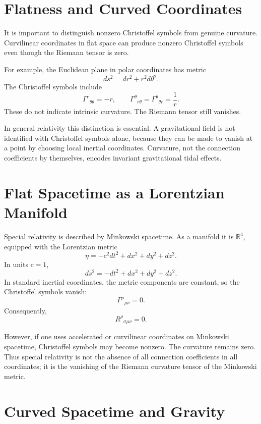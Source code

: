 \clearpage

\section{Flatness and Curved Coordinates}

It is important to distinguish nonzero Christoffel symbols from genuine
curvature. Curvilinear coordinates in flat space can produce nonzero Christoffel
symbols even though the Riemann tensor is zero.

For example, the Euclidean plane in polar coordinates has metric
\[
ds^2=dr^2+r^2d\theta^2.
\]
The Christoffel symbols include
\[
\Gamma^r{}_{\theta\theta}=-r,
\qquad
\Gamma^\theta{}_{r\theta}=\Gamma^\theta{}_{\theta r}=\frac{1}{r}.
\]
These do not indicate intrinsic curvature. The Riemann tensor still vanishes.

In general relativity this distinction is essential. A gravitational field is
not identified with Christoffel symbols alone, because they can be made to vanish
at a point by choosing local inertial coordinates. Curvature, not the connection
coefficients by themselves, encodes invariant gravitational tidal effects.

\clearpage

\section{Flat Spacetime as a Lorentzian Manifold}

Special relativity is described by Minkowski spacetime. As a manifold it is
\(\mathbb{R}^4\), equipped with the Lorentzian metric
\[
\eta=-c^2dt^2+dx^2+dy^2+dz^2.
\]
In units \(c=1\),
\[
ds^2=-dt^2+dx^2+dy^2+dz^2.
\]
In standard inertial coordinates, the metric components are constant, so the
Christoffel symbols vanish:
\[
\Gamma^\rho{}_{\mu\nu}=0.
\]
Consequently,
\[
R^\rho{}_{\sigma\mu\nu}=0.
\]

However, if one uses accelerated or curvilinear coordinates on Minkowski
spacetime, Christoffel symbols may become nonzero. The curvature remains zero.
Thus special relativity is not the absence of all connection coefficients in all
coordinates; it is the vanishing of the Riemann curvature tensor of the
Minkowski metric.

\clearpage

\section{Curved Spacetime and Gravity}

